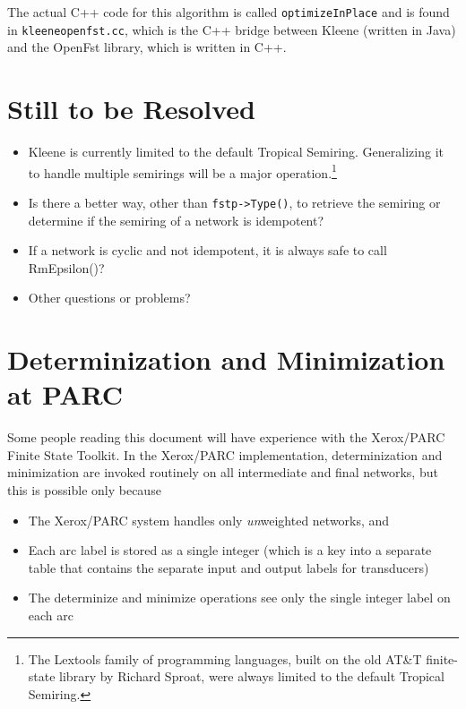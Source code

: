 \documentclass[letterpaper,12pt]{article}
\begin{document}
\noindent
The actual C++ code for this algorithm is called
\texttt{optimizeInPlace} and is found in \texttt{kleeneopenfst.cc},
which is the C++ bridge between Kleene (written in Java) and the
OpenFst library, which is written in C++.

\section{Still to be Resolved}

\begin{itemize}

\item
Kleene is currently limited to the default Tropical Semiring.
Generalizing it to handle multiple semirings will be a major
operation.\footnote{The Lextools family of programming languages,
built on the old AT\&T finite-state library by Richard Sproat, were
always limited to the default Tropical Semiring.}

\item
Is there a better way, other than \texttt{fstp->Type()}, to retrieve the semiring
or determine if the semiring of a network is idempotent?

\item
If a network is cyclic and not idempotent, it is always safe to call
RmEpsilon()?

\item
Other questions or problems?
\end{itemize}


\appendix

\section{Determinization and Minimization at PARC}

Some people reading this document will have experience with the Xerox/PARC Finite
State Toolkit.  
In the Xerox/PARC implementation, determinization and minimization are invoked
routinely on all intermediate and final networks, but this is possible only because 

\begin{itemize}
\item
The Xerox/PARC system handles only \emph{un}weighted networks, and

\item
Each arc label is stored as a single integer (which is a key into a separate table
that contains the separate input and output labels for transducers)

\item
The determinize and minimize operations see only the single integer label on each
arc

\end{itemize}
\end{document}
